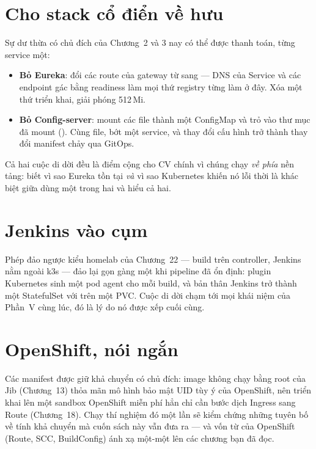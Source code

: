 \section{Cho stack cổ điển về hưu}

Sự dư thừa có chủ đích của Chương~2 và 3 nay có thể được thanh toán,
từng service một:

\begin{itemize}
  \item \textbf{Bỏ Eureka}: đổi các route của gateway từ
   sang  ---
  DNS của Service và các endpoint gác bằng readiness làm mọi thứ
  registry từng làm ở đây. Xóa một thứ triển khai, giải phóng
  512\,Mi.
  \item \textbf{Bỏ Config-server}: mount các file
   thành một ConfigMap và trỏ
   vào thư mục đã mount
  (). Cùng file, bớt một service, và thay
  đổi cấu hình trở thành thay đổi manifest chảy qua GitOps.
\end{itemize}

Cả hai cuộc di dời đều là điểm cộng cho CV chính vì chúng chạy
\emph{về phía} nền tảng: biết vì sao Eureka tồn tại \emph{và} vì sao
Kubernetes khiến nó lỗi thời là khác biệt giữa dùng một trong hai và
hiểu cả hai.

\section{Jenkins vào cụm}

Phép đảo ngược kiểu homelab của Chương~22 --- build trên controller,
Jenkins nằm ngoài k3s --- đảo lại gọn gàng một khi pipeline đã ổn
định: plugin Kubernetes sinh một pod agent cho mỗi build, và bản thân
Jenkins trở thành một StatefulSet với  trên một
PVC. Cuộc di dời chạm tới mọi khái niệm của Phần~V cùng lúc, đó là lý
do nó được xếp cuối cùng.

\section{OpenShift, nói ngắn}

Các manifest được giữ khả chuyển có chủ đích: image không chạy bằng
root của Jib (Chương~13) thỏa mãn mô hình bảo mật UID tùy ý của
OpenShift, nên triển khai lên một sandbox OpenShift miễn phí hẳn chỉ
cần bước dịch Ingress sang Route (Chương~18). Chạy thí nghiệm đó một
lần sẽ kiểm chứng những tuyên bố về tính khả chuyển mà cuốn sách này
vẫn đưa ra --- và vốn từ của OpenShift (Route, SCC, BuildConfig) ánh
xạ một-một lên các chương bạn đã đọc.

